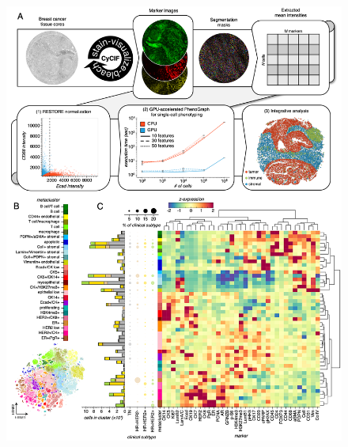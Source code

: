 \documentclass[preprint,review,3p,12pt]{elsarticle}
\begin{document}
\begin{figure}[p]
\centering\includegraphics[width=\linewidth,
                 keepaspectratio]{fig1_secondrevision}
\caption{}
\label{fig:fig1}
\end{figure}

\newpage
\end{document}
